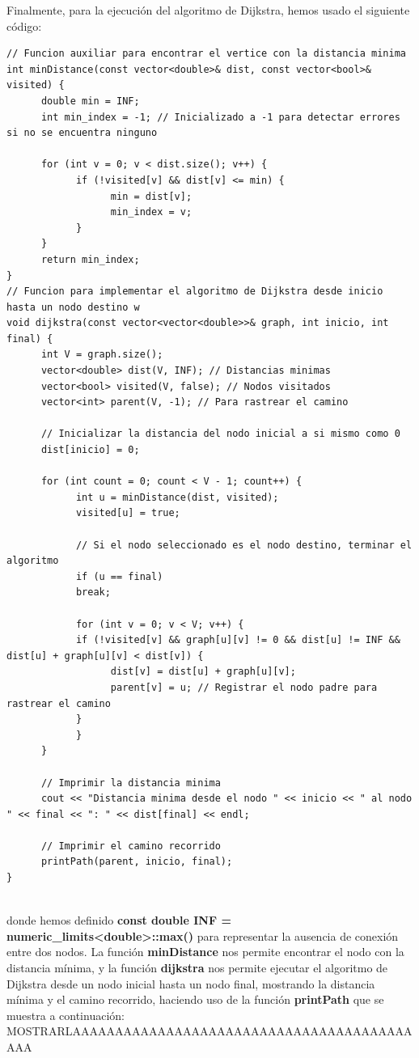 \documentclass[11pt,openany]{book}
\begin{document}
Finalmente, para la ejecución del algoritmo de Dijkstra, hemos usado el siguiente código:
\begin{lstlisting}
// Funcion auxiliar para encontrar el vertice con la distancia minima
int minDistance(const vector<double>& dist, const vector<bool>& visited) {
      double min = INF;
      int min_index = -1; // Inicializado a -1 para detectar errores si no se encuentra ninguno

      for (int v = 0; v < dist.size(); v++) {
            if (!visited[v] && dist[v] <= min) {
                  min = dist[v];
                  min_index = v;
            }
      }
      return min_index;
}
// Funcion para implementar el algoritmo de Dijkstra desde inicio hasta un nodo destino w
void dijkstra(const vector<vector<double>>& graph, int inicio, int final) {
      int V = graph.size();
      vector<double> dist(V, INF); // Distancias minimas
      vector<bool> visited(V, false); // Nodos visitados
      vector<int> parent(V, -1); // Para rastrear el camino

      // Inicializar la distancia del nodo inicial a si mismo como 0
      dist[inicio] = 0;
      
      for (int count = 0; count < V - 1; count++) {
            int u = minDistance(dist, visited);
            visited[u] = true;
      
            // Si el nodo seleccionado es el nodo destino, terminar el algoritmo
            if (u == final)
            break;
      
            for (int v = 0; v < V; v++) {
            if (!visited[v] && graph[u][v] != 0 && dist[u] != INF && dist[u] + graph[u][v] < dist[v]) {
                  dist[v] = dist[u] + graph[u][v];
                  parent[v] = u; // Registrar el nodo padre para rastrear el camino
            }
            }
      }
      
      // Imprimir la distancia minima
      cout << "Distancia minima desde el nodo " << inicio << " al nodo " << final << ": " << dist[final] << endl;

      // Imprimir el camino recorrido
      printPath(parent, inicio, final);
}
       
\end{lstlisting}
donde hemos definido \textbf{const double INF = numeric\_limits<double>::max()} para representar la ausencia de conexión entre dos nodos.
La función \textbf{minDistance} nos permite encontrar el nodo con la distancia mínima, y la función \textbf{dijkstra} nos permite ejecutar
el algoritmo de Dijkstra desde un nodo inicial hasta un nodo final, mostrando la distancia mínima y el camino recorrido, haciendo uso
de la función \textbf{printPath} que se muestra a continuación:
MOSTRARLAAAAAAAAAAAAAAAAAAAAAAAAAAAAAAAAAAAAAAAAAAA
\end{document}
